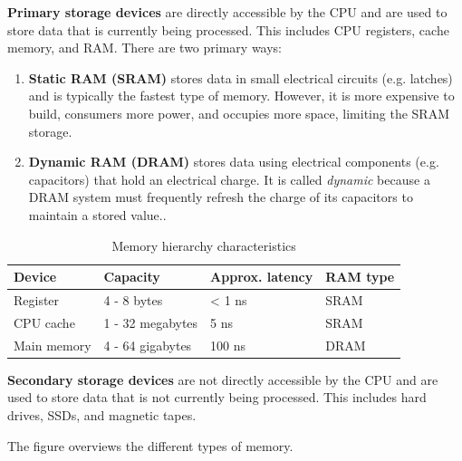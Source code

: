 \documentclass{article}
\begin{document}
    \begin{definition}
      \textbf{Primary storage devices} are directly accessible by the CPU and are used to store data that is currently being processed. This includes CPU registers, cache memory, and RAM. There are two primary ways: 
      \begin{enumerate}
        \item \textbf{Static RAM (SRAM)} stores data in small electrical circuits (e.g. latches) and is typically the fastest type of memory. However, it is more expensive to build, consumers more power, and occupies more space, limiting the SRAM storage. 
        \item \textbf{Dynamic RAM (DRAM)} stores data using electrical components (e.g. capacitors) that hold an electrical charge. It is called \textit{dynamic} because a DRAM system must frequently refresh the charge of its capacitors to maintain a stored value.. 
      \end{enumerate}

      \begin{table}[H]
        \centering
        \begin{tabular}{|l|l|l|l|}
        \hline
        \textbf{Device} & \textbf{Capacity} & \textbf{Approx. latency} & \textbf{RAM type} \\ \hline
        Register & 4 - 8 bytes & < 1 ns & SRAM \\ \hline
        CPU cache & 1 - 32 megabytes & 5 ns & SRAM \\ \hline
        Main memory & 4 - 64 gigabytes & 100 ns & DRAM \\ \hline
        \end{tabular}
        \caption{Memory hierarchy characteristics}
        \label{tab:memory_hierarchy}
      \end{table}
    \end{definition}

    \begin{definition}
      \textbf{Secondary storage devices} are not directly accessible by the CPU and are used to store data that is not currently being processed. This includes hard drives, SSDs, and magnetic tapes.
    \end{definition}

    The figure overviews the different types of memory. 
\end{document}
